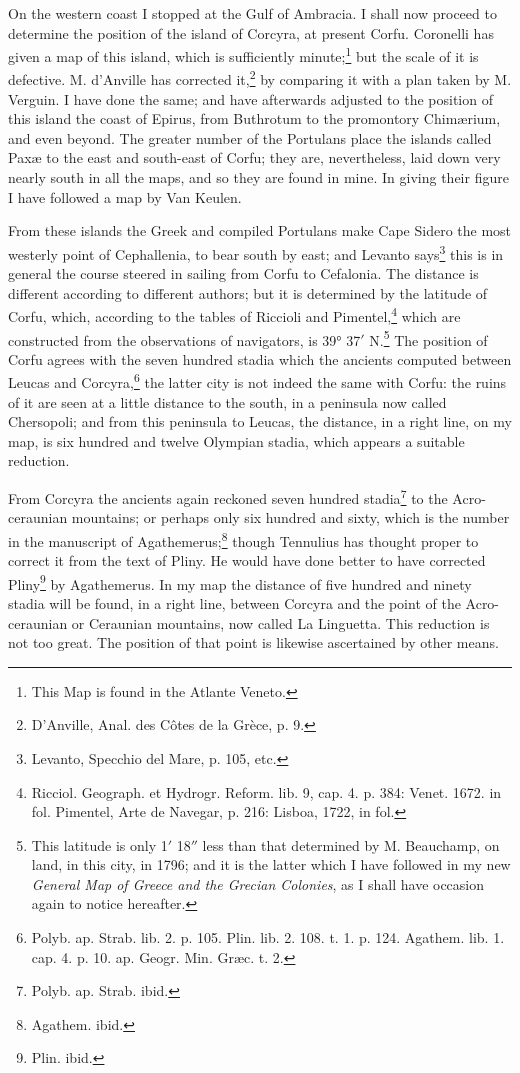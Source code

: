 \documentclass[a4paper, 11pt, oneside, polutonikogreek, english]{article}
\begin{document}
On the western coast I stopped at the Gulf of Ambracia. I shall now proceed to determine the position of the island of Corcyra, at present Corfu. Coronelli has given a map of this island, which is sufficiently minute;\footnote{This Map is found in the Atlante Veneto.} but the scale of it is defective. M. d'Anville has corrected it,\footnote{D'Anville, Anal. des Côtes de la Grèce, p. 9.} by comparing it with a plan taken by M. Verguin. I have done the same; and have afterwards adjusted to the position of this island the coast of Epirus, from Buthrotum to the promontory Chimærium, and even beyond. The greater number of the Portulans place the islands called Paxæ to the east and south-east of Corfu; they are, nevertheless, laid down very nearly south in all the maps, and so they are found in mine. In giving their figure I have followed a map by Van Keulen.

From these islands the Greek and compiled Portulans make Cape Sidero the most westerly point of Cephallenia, to bear south by east; and Levanto says\footnote{Levanto, Specchio del Mare, p. 105, etc.} this is in general the course steered in sailing from Corfu to Cefalonia. The distance is different according to different authors; but it is determined by the latitude of Corfu, which, according to the tables of Riccioli and Pimentel,\footnote{Ricciol. Geograph. et Hydrogr. Reform. lib. 9, cap. 4. p. 384: Venet. 1672. in fol. Pimentel, Arte de Navegar, p. 216: Lisboa, 1722, in fol.} which are constructed from the observations of navigators, is 39° 37$'$ N.\footnote{This latitude is only 1$'$ 18$''$ less than that determined by M. Beauchamp, on land, in this city, in 1796; and it is the latter which I have followed in my new \emph{General Map of Greece and the Grecian Colonies}, as I shall have occasion again to notice hereafter.} The position of Corfu agrees with the seven hundred stadia which the ancients computed between Leucas and Corcyra,\footnote{Polyb. ap. Strab. lib. 2. p. 105. Plin. lib. 2. 108. t. 1. p. 124. Agathem. lib. 1. cap. 4. p. 10. ap. Geogr. Min. Græc. t. 2.} the latter city is not indeed the same with Corfu: the ruins of it are seen at a little distance to the south, in a peninsula now called Chersopoli; and from this peninsula to Leucas, the distance, in a right line, on my map, is six hundred and twelve Olympian stadia, which appears a suitable reduction.

From Corcyra the ancients again reckoned seven hundred stadia\footnote{Polyb. ap. Strab. ibid.} to the Acro-ceraunian mountains; or perhaps only six hundred and sixty, which is the number in the manuscript of Agathemerus;\footnote{Agathem. ibid.} though Tennulius has thought proper to correct it from the text of Pliny. He would have done better to have corrected Pliny\footnote{Plin. ibid.} by Agathemerus. In my map the distance of five hundred and ninety stadia will be found, in a right line, between Corcyra and the point of the Acro-ceraunian or Ceraunian mountains, now called La Linguetta. This reduction is not too great. The position of that point is likewise ascertained by other means.
\end{document}
